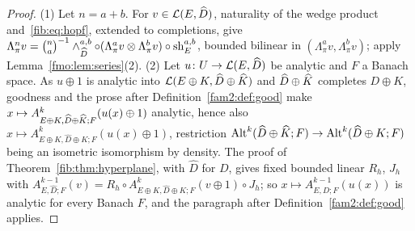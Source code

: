 \begin{proof}
(1) Let $n=a+b$. For $v\in\mathcal L(E,\widehat D)$, naturality of the wedge product and~\eqref{fib:eq:hopf}, extended to
completions, give $\Lambda^n_\pi v=\binom na^{-1}\wedge^{a,b}_{\widehat D}\circ(\Lambda^a_\pi v\otimes\Lambda^b_\pi v)\circ
\operatorname{sh}^{a,b}_E$, bounded bilinear in $(\Lambda^a_\pi v,\Lambda^b_\pi v)$; apply Lemma~\ref{fmo:lem:series}(2).
(2) Let $u\colon U\to\mathcal L(E,\widehat D)$ be analytic and $F$ a Banach space. As $u\oplus1$ is analytic into
$\mathcal L(E\oplus K,\widehat D\oplus\widehat K)$ and $\widehat D\oplus\widehat K$ completes $D\oplus K$, goodness and the prose after
Definition~\ref{fam2:def:good} make $x\mapsto A^k_{E\oplus K,\widehat D\oplus\widehat K;F}(u(x)\oplus1)$ analytic, hence also
$x\mapsto A^k_{E\oplus K,\widehat D\oplus K;F}(u(x)\oplus1)$, restriction $\operatorname{Alt}^k(\widehat D\oplus\widehat K;F)\to
\operatorname{Alt}^k(\widehat D\oplus K;F)$ being an isometric isomorphism by density. The proof of Theorem~\ref{fib:thm:hyperplane},
with $\widehat D$ for $D$, gives
fixed bounded linear $R_h$, $J_h$ with $A^{k-1}_{E,\widehat D;F}(v)=R_h\circ A^k_{E\oplus K,\widehat D\oplus K;F}(v\oplus1)
\circ J_h$; so $x\mapsto A^{k-1}_{E,\widehat D;F}(u(x))$ is analytic for every Banach $F$, and the paragraph after
Definition~\ref{fam2:def:good} applies.
\end{proof}

